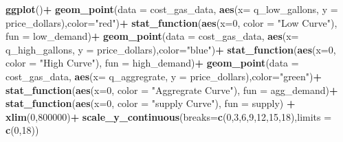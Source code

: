 \documentclass[]{article}
\newenvironment{Shaded}{\begin{snugshade}}{\end{snugshade}}
\newcommand{\DataTypeTok}[1]{\textcolor[rgb]{0.13,0.29,0.53}{#1}}
\newcommand{\DecValTok}[1]{\textcolor[rgb]{0.00,0.00,0.81}{#1}}
\newcommand{\KeywordTok}[1]{\textcolor[rgb]{0.13,0.29,0.53}{\textbf{#1}}}
\newcommand{\NormalTok}[1]{#1}
\newcommand{\OperatorTok}[1]{\textcolor[rgb]{0.81,0.36,0.00}{\textbf{#1}}}
\newcommand{\StringTok}[1]{\textcolor[rgb]{0.31,0.60,0.02}{#1}}
\begin{document}
\begin{Shaded}
\begin{Highlighting}[]
\KeywordTok{ggplot}\NormalTok{()}\OperatorTok{+}
\StringTok{  }\KeywordTok{geom_point}\NormalTok{(}\DataTypeTok{data =}\NormalTok{ cost_gas_data, }\KeywordTok{aes}\NormalTok{(}\DataTypeTok{x=}\NormalTok{ q_low_gallons, }\DataTypeTok{y =}\NormalTok{ price_dollars),}\DataTypeTok{color=}\StringTok{"red"}\NormalTok{)}\OperatorTok{+}
\StringTok{  }\KeywordTok{stat_function}\NormalTok{(}\KeywordTok{aes}\NormalTok{(}\DataTypeTok{x=}\DecValTok{0}\NormalTok{, }\DataTypeTok{color =} \StringTok{"Low Curve"}\NormalTok{), }\DataTypeTok{fun =}\NormalTok{ low_demand)}\OperatorTok{+}\StringTok{ }
\StringTok{  }\KeywordTok{geom_point}\NormalTok{(}\DataTypeTok{data =}\NormalTok{ cost_gas_data, }\KeywordTok{aes}\NormalTok{(}\DataTypeTok{x=}\NormalTok{ q_high_gallons, }\DataTypeTok{y =}\NormalTok{ price_dollars),}\DataTypeTok{color=}\StringTok{"blue"}\NormalTok{)}\OperatorTok{+}
\StringTok{  }\KeywordTok{stat_function}\NormalTok{(}\KeywordTok{aes}\NormalTok{(}\DataTypeTok{x=}\DecValTok{0}\NormalTok{, }\DataTypeTok{color =} \StringTok{"High Curve"}\NormalTok{), }\DataTypeTok{fun =}\NormalTok{ high_demand)}\OperatorTok{+}
\StringTok{  }\KeywordTok{geom_point}\NormalTok{(}\DataTypeTok{data =}\NormalTok{ cost_gas_data, }\KeywordTok{aes}\NormalTok{(}\DataTypeTok{x=}\NormalTok{ q_aggregrate, }\DataTypeTok{y =}\NormalTok{ price_dollars),}\DataTypeTok{color=}\StringTok{"green"}\NormalTok{)}\OperatorTok{+}
\StringTok{  }\KeywordTok{stat_function}\NormalTok{(}\KeywordTok{aes}\NormalTok{(}\DataTypeTok{x=}\DecValTok{0}\NormalTok{, }\DataTypeTok{color =} \StringTok{"Aggregrate Curve"}\NormalTok{), }\DataTypeTok{fun =}\NormalTok{ agg_demand)}\OperatorTok{+}
\StringTok{  }\KeywordTok{stat_function}\NormalTok{(}\KeywordTok{aes}\NormalTok{(}\DataTypeTok{x=}\DecValTok{0}\NormalTok{, }\DataTypeTok{color =} \StringTok{"supply Curve"}\NormalTok{), }\DataTypeTok{fun =}\NormalTok{ supply)  }\OperatorTok{+}
\StringTok{  }\KeywordTok{xlim}\NormalTok{(}\DecValTok{0}\NormalTok{,}\DecValTok{800000}\NormalTok{)}\OperatorTok{+}\StringTok{ }
\StringTok{  }\KeywordTok{scale_y_continuous}\NormalTok{(}\DataTypeTok{breaks=}\KeywordTok{c}\NormalTok{(}\DecValTok{0}\NormalTok{,}\DecValTok{3}\NormalTok{,}\DecValTok{6}\NormalTok{,}\DecValTok{9}\NormalTok{,}\DecValTok{12}\NormalTok{,}\DecValTok{15}\NormalTok{,}\DecValTok{18}\NormalTok{),}\DataTypeTok{limits =} \KeywordTok{c}\NormalTok{(}\DecValTok{0}\NormalTok{,}\DecValTok{18}\NormalTok{))}
\end{Highlighting}
\end{Shaded}
\end{document}
